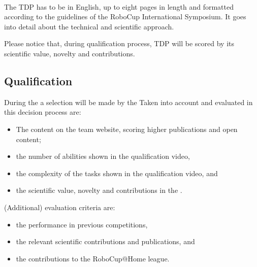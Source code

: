 ~\\\noindent The TDP has to be in English, up to eight pages in length and formatted according to the guidelines of the RoboCup International Symposium. It goes into detail about the technical and scientific approach.

Please notice that, during qualification process, TDP will be scored by its scientific value, novelty and contributions.


\subsection{Qualification}
\label{rule:qualification}

During the  a selection will be made by the  Taken into account and evaluated in this decision process are:
\begin{itemize}
	\item The content on the team website, scoring higher publications and open content;
	\item the number of abilities shown in the qualification video,
	\item the complexity of the tasks shown in the qualification video, and
	\item the scientific value, novelty and contributions in the . %
\end{itemize}
(Additional) evaluation criteria are: 
\begin{itemize}
	\item the performance in previous competitions, 
	\item the relevant scientific contributions and publications, and
	\item the contributions to the RoboCup@Home league.
\end{itemize}


